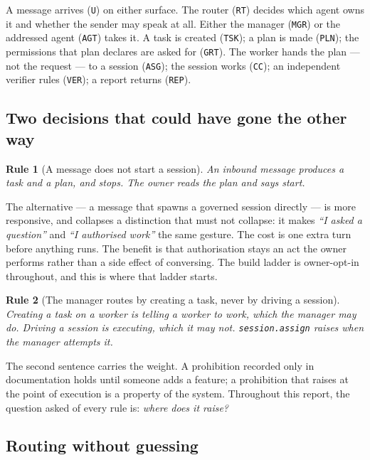 \documentclass[11pt]{article}
\newtheorem{drule}{Rule}
\newcommand{\code}[1]{\texttt{\small #1}}
\begin{document}
A message arrives (\code{U}) on either surface. The router (\code{RT}) decides which agent owns it and whether the sender may speak at all. Either the manager (\code{MGR}) or the addressed agent (\code{AGT}) takes it. A task is created (\code{TSK}); a plan is made (\code{PLN}); the permissions that plan declares are asked for (\code{GRT}). The worker hands the plan --- not the request --- to a session (\code{ASG}); the session works (\code{CC}); an independent verifier rules (\code{VER}); a report returns (\code{REP}).

\subsection{Two decisions that could have gone the other way}

\begin{drule}[A message does not start a session]
\label{rule:nostart}
An inbound message produces a task and a plan, and stops. The owner reads the plan and says start.
\end{drule}

The alternative --- a message that spawns a governed session directly --- is more responsive, and collapses a distinction that must not collapse: it makes \emph{``I asked a question''} and \emph{``I authorised work''} the same gesture. The cost is one extra turn before anything runs. The benefit is that authorisation stays an act the owner performs rather than a side effect of conversing. The build ladder is owner-opt-in throughout, and this is where that ladder starts.

\begin{drule}[The manager routes by creating a task, never by driving a session]
\label{rule:mgrroutes}
Creating a task on a worker is telling a worker to work, which the manager may do. Driving a session is executing, which it may not. \code{session.assign} raises when the manager attempts it.
\end{drule}

The second sentence carries the weight. A prohibition recorded only in documentation holds until someone adds a feature; a prohibition that raises at the point of execution is a property of the system. Throughout this report, the question asked of every rule is: \emph{where does it raise?}

\subsection{Routing without guessing}
\end{document}
